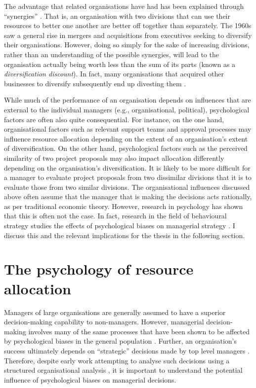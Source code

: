 \documentclass[a4paper, nobind, dvipsnames]{templates/ociamthesis}
\theoremstyle{definition}
\theoremstyle{definition}
\theoremstyle{definition}
\theoremstyle{definition}
\theoremstyle{remark}
\begin{document}
The advantage that related organisations have had has been explained through
``synergies'' \autocite{barney1988}. That is, an organisation with two divisions that can
use their resources to better one another are better off together than
separately. The 1960s saw a general rise in mergers and acquisitions from
executives seeking to diversify their organisations. However, doing so simply
for the sake of increasing divisions, rather than an understanding of the
possible synergies, will lead to the organisation actually being worth less than
the sum of its parts (known as a \emph{diversification discount}). In fact, many
organisations that acquired other businesses to diversify subsequently end up
divesting them \autocite{porter1987}.

While much of the performance of an organisation depends on influences that are
external to the individual managers (e.g., organisational, political),
psychological factors are often also quite consequential. For instance, on the
one hand, organisational factors such as relevant support teams and approval
processes may influence resource allocation depending on the extent of an
organisation's extent of diversification. On the other hand, psychological
factors such as the perceived similarity of two project proposals may also
impact allocation differently depending on the organisation's diversification.
It is likely to be more difficult for a manager to evaluate project proposals
from two dissimilar divisions that it is to evaluate those from two similar
divisions. The organisational influences discussed above often assume that the
manager that is making the decisions acts rationally, as per traditional
economic theory. However, research in psychology has shown that this is often
not the case. In fact, research in the field of behavioural strategy studies the
effects of psychological biases on managerial strategy \autocite{powell2011}. I discuss
this and the relevant implications for the thesis in the following section.

\section{The psychology of resource allocation}

Managers of large organisations are generally assumed to have a superior
decision-making capability to non-managers. However, managerial decision-making
involves many of the same processes that have been shown to be affected by
psychological biases in the general population \autocite{schwenk1984,das1999,mccray2002}. Further, an organisation's success ultimately depends on
``strategic'' decisions made by top level managers \autocite{mazzolini1981}. Therefore,
despite early work attempting to analyse such decisions using a structured
organisational analysis \autocite[e.g.,][]{mintzberg1976}, it is important to understand
the potential influence of psychological biases on managerial decisions.
\end{document}
